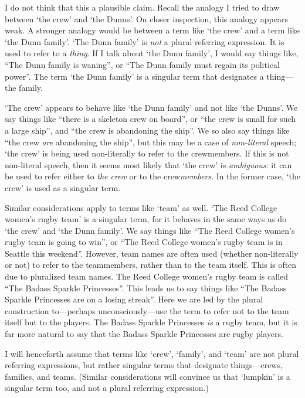 \documentclass[11pt]{article}
\begin{document}
\begin{spacing}{1.25}
I do not think that this a plausible claim.  Recall the analogy I
tried to draw between `the crew' and `the Dunns'.  On closer
inspection, this analogy appears weak.  A stronger analogy would be
between a term like `the crew' and a term like `the Dunn family'.
`The Dunn family' is {\em not} a plural referring expression.  It is
used to refer to a {\em thing}.  If I talk about `the Dunn family', I
would say things like, ``The Dunn family is waning'', or ``The Dunn
family must regain its political power''.  The term `the Dunn family'
is a singular term that designates a thing---the family.

`The crew' appears to behave like `the Dunn family' and not like `the
Dunns'.  We say things like ``there is a skeleton crew on board'', or
``the crew is small for such a large ship'', and ``the crew is
abandoning the ship''.  We so also say things like ``the crew {\em
  are} abandoning the ship'', but this may be a case of {\em
  non-literal} speech; `the crew' is being used non-literally to refer
to the crewmembers.  If this is not non-literal speech, then it seems
most likely that `the crew' is {\em ambiguous}: it can be used to
refer either to {\em the crew} or to the crew{\em members}.  In the
former case, `the crew' is used as a singular term.

Similar considerations apply to terms like `team' as well.  `The Reed
College women's rugby team' is a singular term, for it behaves in the
same ways as do `the crew' and `the Dunn family'.  We say things like
``The Reed College women's rugby team is going to win'', or ``The Reed
College women's rugby team is in Seattle this weekend''.  However,
team names are often used (whether non-literally or not) to refer to
the teammembers, rather than to the team itself.  This is often due to
pluralized team names.  The Reed College women's rugby team is called
``The Badass Sparkle Princesses''.  This leads us to say things like
``The Badass Sparkle Princesses are on a losing streak''.  Here we are
led by the plural construction to---perhaps unconsciously---use the
term to refer not to the team itself but to the players.  The Badass
Sparkle Princesses {\em is} a rugby team, but it is far more natural
to say that the Badass Sparkle Princesses are rugby players.

I will henceforth assume that terms like `crew', `family', and `team'
are not plural referring expressions, but rather singular terms that
designate things---crews, families, and teams.  (Similar
considerations will convince us that `lumpkin' is a singular term too,
and not a plural referring expression.)


\end{spacing}
\end{document}
